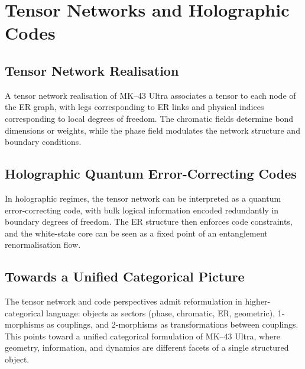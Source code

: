 \chapter{Tensor Networks and Holographic Codes}

\section{Tensor Network Realisation}

A tensor network realisation of MK--43 Ultra associates a tensor to each node of the ER graph, with legs corresponding to ER links and physical indices corresponding to local degrees of freedom.
The chromatic fields determine bond dimensions or weights, while the phase field modulates the network structure and boundary conditions.

\section{Holographic Quantum Error-Correcting Codes}

In holographic regimes, the tensor network can be interpreted as a quantum error-correcting code, with bulk logical information encoded redundantly in boundary degrees of freedom.
The ER structure then enforces code constraints, and the white-state core can be seen as a fixed point of an entanglement renormalisation flow.

\section{Towards a Unified Categorical Picture}

The tensor network and code perspectives admit reformulation in higher-categorical language:
objects as sectors (phase, chromatic, ER, geometric), 1-morphisms as couplings, and 2-morphisms as transformations between couplings.
This points toward a unified categorical formulation of MK--43 Ultra, where geometry, information, and dynamics are different facets of a single structured object.
